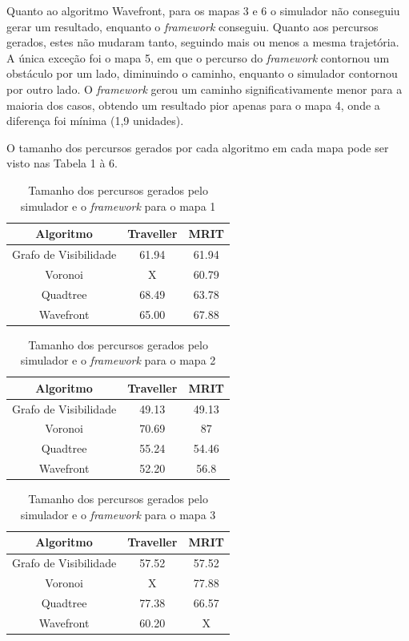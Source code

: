 Quanto ao algoritmo Wavefront, para os mapas 3 e 6 o simulador não conseguiu gerar um resultado, enquanto o \textit{framework} conseguiu. Quanto aos percursos gerados,
estes não mudaram tanto, seguindo mais ou menos a mesma trajetória. A única exceção foi o mapa 5, em que o percurso do \textit{framework} contornou um obstáculo por um lado, diminuindo o caminho, enquanto o simulador contornou por outro lado. O \textit{framework} gerou um caminho significativamente menor para a maioria dos casos, obtendo um resultado pior apenas para o mapa 4, onde a diferença foi mínima (1,9 unidades).

O tamanho dos percursos gerados por cada algoritmo em cada mapa pode ser visto nas Tabela 1 à 6.

\begin{table}[h]
	\centering
	\label{tab01}
	\caption{Tamanho dos percursos gerados pelo simulador e o \textit{framework} para o mapa 1}
	\begin{tabular}{ccc}
		\toprule
		\textbf{Algoritmo} & \textbf{Traveller} & \textbf{MRIT} \\
		\midrule
Grafo de Visibilidade & 61.94   & 61.94 \\
Voronoi 				  & X       & 60.79 \\
Quadtree				  & 68.49   & 63.78 \\
Wavefront             & 65.00    & 67.88  \\
		\bottomrule
	\end{tabular}
\end{table}

\begin{table}[H]
	\centering
	\label{tab02}
	\caption{Tamanho dos percursos gerados pelo simulador e o \textit{framework} para o mapa 2}
	\begin{tabular}{ccc}
		\toprule
		\textbf{Algoritmo} & \textbf{Traveller} & \textbf{MRIT} \\
		\midrule
Grafo de Visibilidade & 49.13   & 49.13 \\
Voronoi 				  & 70.69   & 87 \\
Quadtree				  & 55.24   & 54.46 \\
Wavefront             & 52.20    & 56.8  \\
		\bottomrule
	\end{tabular}
\end{table}

\begin{table}[H]
	\centering
	\label{tab03}
	\caption{Tamanho dos percursos gerados pelo simulador e o \textit{framework} para o mapa 3}
	\begin{tabular}{ccc}
		\toprule
		\textbf{Algoritmo} & \textbf{Traveller} & \textbf{MRIT} \\
		\midrule
Grafo de Visibilidade & 57.52   & 57.52 \\
Voronoi 				  & X   		& 77.88 \\
Quadtree				  & 77.38   & 66.57 \\
Wavefront             & 60.20    & X  \\
		\bottomrule
	\end{tabular}
\end{table}

